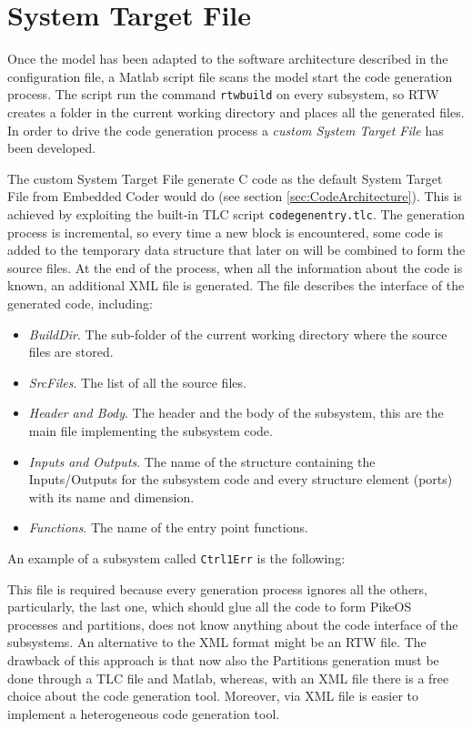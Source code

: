 \section{System Target File}\label{slexSTF}
Once the model has been adapted to the software architecture described in the configuration file, a Matlab script file scans the model start the code generation process. The script run the command \verb|rtwbuild| on every subsystem, so RTW creates a folder in the current working directory and places all the generated files. In order to drive the code generation process a \emph{custom System Target File} has been developed.%
\par The custom System Target File generate C code as the default System Target File from Embedded Coder would do (see section \ref{sec:CodeArchitecture}). This is achieved by exploiting the built-in TLC script \verb|codegenentry.tlc|. The generation process is incremental, so every time a new block is encountered, some code is added to the temporary data structure that later on will be combined to form the source files. At the end of the process, when all the information about the code is known, an additional XML file is generated. The file describes the interface of the generated code, including:
\begin{itemize}
\item \emph{BuildDir}. The sub-folder of the current working directory where the source files are stored.
\item \emph{SrcFiles}. The list of all the source files.
\item \emph{Header and Body}. The header and the body of the subsystem, this are the main file implementing the subsystem code.
\item \emph{Inputs and Outputs}. The name of the structure containing the Inputs/Outputs for the subsystem code and every structure element (ports) with its name and dimension.
\item \emph{Functions}. The name of the entry point functions.
\end{itemize}
An example of a subsystem called \verb|Ctrl1Err| is the following:

This file is required because every generation process ignores all the others, particularly, the last one, which should glue all the code to form PikeOS processes and partitions, does not know anything about the code interface of the subsystems. An alternative to the XML format might be an RTW file. The drawback of this approach is that now also the Partitions generation must be done through a TLC file and Matlab, whereas, with an XML file there is a free choice about the code generation tool. Moreover, via XML file is easier to implement a heterogeneous code generation tool.

